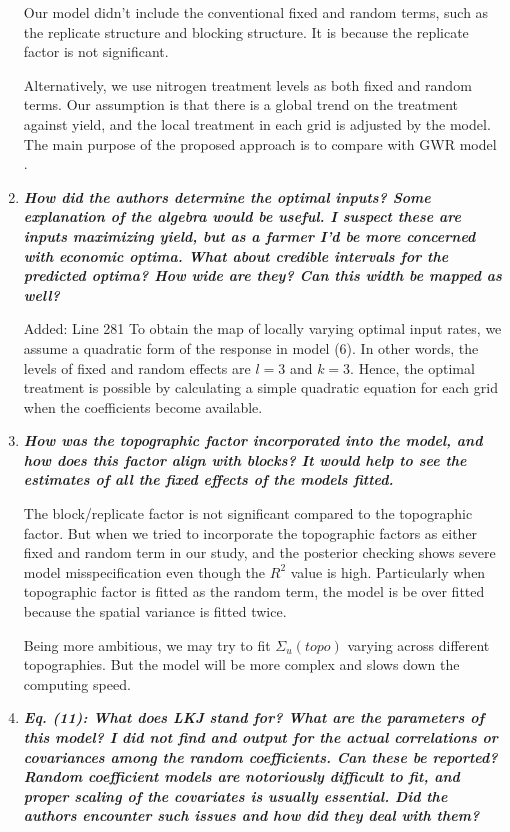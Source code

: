\documentclass[a4paper]{article}   	%
\newcommand{\qtitle}[1]{\textit{\textbf{#1}}}
\begin{document}
\begin{enumerate}
    Our model didn't include the conventional fixed and random terms, such as the replicate structure and blocking structure. It is because the replicate factor is not significant. 
    
    Alternatively, we use nitrogen treatment levels as both fixed and random terms. Our assumption is that there is a global trend on the treatment against yield, and the local treatment in each grid is adjusted by the model. The main purpose of the proposed approach is to compare with GWR model \parencite{Rakshit2020Novel}.

    \item \qtitle{How did the authors determine the optimal inputs? Some explanation of the algebra would be useful. I suspect these are inputs maximizing yield, but as a farmer I'd be more concerned with economic optima. What about credible intervals for the predicted optima? How wide are they? Can this width be mapped as well?}

    Added: Line 281 To obtain the map of locally varying optimal input rates, we assume a quadratic form of the response in model (6). In other words, the levels of fixed and random effects are $l=3$ and $k=3$. Hence, the optimal treatment is possible by calculating a simple quadratic equation for each grid when the coefficients become available.

    \item \qtitle{How was the topographic factor incorporated into the model, and how does this factor align with blocks? It would help to see the estimates of all the fixed effects of the models fitted.}

    The block/replicate factor is not significant compared to the topographic factor. But when we tried to incorporate the topographic factors as either fixed and random term in our study, and the posterior checking shows severe model misspecification even though the $R^2$ value is high. Particularly when topographic factor is fitted as the random term, the model is be over fitted because the spatial variance is fitted twice. 
    
    Being more ambitious, we may try to fit $\Sigma_u(topo)$ varying across different topographies. But the model will be more complex and slows down the computing speed. 

    \item \qtitle{Eq. (11): What does LKJ stand for? What are the parameters of this model? I did not find and output for the actual correlations or covariances among the random coefficients. Can these be reported? Random coefficient models are notoriously difficult to fit, and proper scaling of the covariates is usually essential. Did the authors encounter such issues and how did they deal with them?}


\end{enumerate}
\end{document}

